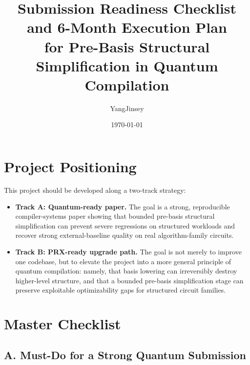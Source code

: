 \documentclass[11pt]{article}
\title{Submission Readiness Checklist and 6-Month Execution Plan\\
for Pre-Basis Structural Simplification in Quantum Compilation}
\author{YangJinsey}
\date{\today}
\begin{document}
\maketitle

\section{Project Positioning}

\noindent
This project should be developed along a two-track strategy:

\begin{itemize}
    \item \textbf{Track A: Quantum-ready paper.}  
    The goal is a strong, reproducible compiler-systems paper showing that bounded pre-basis structural simplification can prevent severe regressions on structured workloads and recover strong external-baseline quality on real algorithm-family circuits.
    
    \item \textbf{Track B: PRX-ready upgrade path.}  
    The goal is not merely to improve one codebase, but to elevate the project into a more general principle of quantum compilation: namely, that basis lowering can irreversibly destroy higher-level structure, and that a bounded pre-basis simplification stage can preserve exploitable optimizability gaps for structured circuit families.
\end{itemize}

\section{Master Checklist}

\subsection{A. Must-Do for a Strong Quantum Submission}
\end{document}
